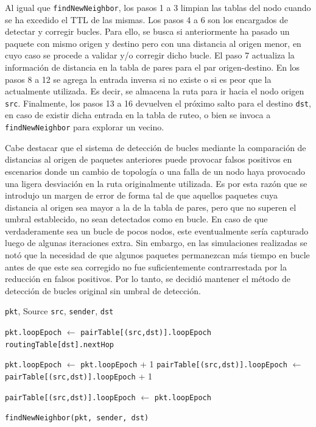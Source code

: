 Al igual que \texttt{findNewNeighbor}, los pasos 1 a 3 limpian las tablas del nodo cuando se ha excedido el TTL de las mismas. Los pasos 4 a 6 son los encargados de detectar y corregir bucles. Para ello, se busca si anteriormente ha pasado un paquete con mismo origen y destino pero con una distancia al origen menor, en cuyo caso se procede a validar y/o corregir dicho bucle. El paso 7 actualiza la información de distancia en la tabla de pares para el par origen-destino. En los pasos 8 a 12 se agrega la entrada inversa si no existe o si es peor que la actualmente utilizada. Es decir, se almacena la ruta para ir hacia el nodo origen \texttt{src}. Finalmente, los pasos 13 a 16 devuelven el próximo salto para el destino \texttt{dst}, en caso de existir dicha entrada en la tabla de ruteo, o bien se invoca a \texttt{findNewNeighbor} para explorar un vecino.

Cabe destacar que el sistema de detección de bucles mediante la comparación de distancias al origen de paquetes anteriores puede provocar falsos positivos en escenarios donde un cambio de topología o una falla de un nodo haya provocado una ligera desviación en la ruta originalmente utilizada. Es por esta razón que se introdujo un margen de error de forma tal de que aquellos paquetes cuya distancia al origen sea mayor a la de la tabla de pares, pero que no superen el umbral establecido, no sean detectados como en bucle. En caso de que verdaderamente sea un bucle de pocos nodos, este eventualmente sería capturado luego de algunas iteraciones extra. Sin embargo, en las simulaciones realizadas se notó que la necesidad de que algunos paquetes permanezcan más tiempo en bucle antes de que este sea corregido no fue suficientemente contrarrestada por la reducción en falsos positivos. Por lo tanto, se decidió mantener el método de detección de bucles original sin umbral de detección.

\begin{algorithm}
\caption{\texttt{handleLoop}}
\label{alg:handle-loop}
\begin{algorithmic}[1]
\Require \texttt{pkt}, Source \texttt{src}, \texttt{sender}, \texttt{dst}

    \State \texttt{pkt.loopEpoch} $\gets$ \texttt{pairTable[(src,dst)].loopEpoch}
    \State \Return \texttt{routingTable[dst].nextHop}
\EndIf

\State \texttt{pkt.loopEpoch} $\gets$ \texttt{pkt.loopEpoch} + 1
\State \texttt{pairTable[(src,dst)].loopEpoch} $\gets$ \texttt{pairTable[(src,dst)].loopEpoch} + 1

    \State \texttt{pairTable[(src,dst)].loopEpoch} $\gets$ \texttt{pkt.loopEpoch}
\EndIf

\State \Return \texttt{findNewNeighbor(pkt, sender, dst)}
\end{algorithmic}
\end{algorithm}

